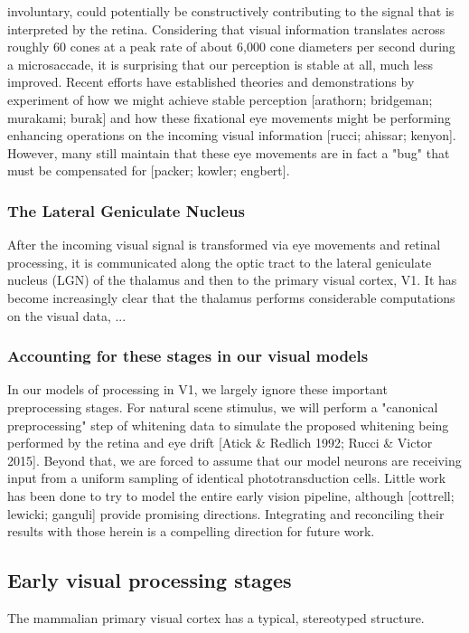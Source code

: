 involuntary, could potentially be constructively contributing to the signal that is interpreted by the retina. Considering that visual information translates across roughly 60 cones at a peak rate of about 6,000 cone diameters per second during a microsaccade, it is surprising that our perception is stable at all, much less improved. Recent efforts have established theories and demonstrations by experiment of how we might achieve stable perception [arathorn; bridgeman; murakami; burak] and how these fixational eye movements might be performing enhancing operations on the incoming visual information [rucci; ahissar; kenyon]. However, many still maintain that these eye movements are in fact a "bug" that must be compensated for [packer; kowler; engbert].

\subsubsection{The Lateral Geniculate Nucleus} After the incoming visual signal is transformed via eye movements and retinal processing, it is communicated along the optic tract to the lateral geniculate nucleus (LGN) of the thalamus and then to the primary visual cortex, V1. It has become increasingly clear that the thalamus performs considerable computations on the visual data, ...

\subsubsection{Accounting for these stages in our visual models} In our models of processing in V1, we largely ignore these important preprocessing stages. For natural scene stimulus, we will perform a "canonical preprocessing" step of whitening data to simulate the proposed whitening being performed by the retina and eye drift [Atick & Redlich 1992; Rucci & Victor 2015]. Beyond that, we are forced to assume that our model neurons are receiving input from a uniform sampling of identical phototransduction cells. Little work has been done to try to model the entire early vision pipeline, although [cottrell; lewicki; ganguli] provide promising directions. Integrating and reconciling their results with those herein is a compelling direction for future work.

\subsection{Early visual processing stages}
The mammalian primary visual cortex has a typical, stereotyped structure. 

